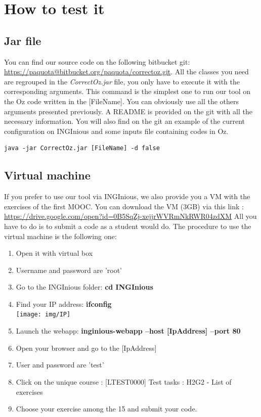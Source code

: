 \documentclass[11pt,a4paper,twoside,openright]{report}
\begin{document}

\nocite{*}


\appendix
\chapter{How to test it}
\section*{Jar file}
\label{app:git}
You can find our source code on the following bitbucket git: 
\url{https://paquota@bitbucket.org/paquota/correctoz.git}. All the classes 
you need are regrouped in the \textit{CorrectOz.jar} file, you only have to 
execute it with the corresponding arguments. This command is the simplest one 
to 
run our tool on the Oz code written in the [FileName]. You can obviously use 
all 
the others arguments presented previously. A README is provided on the git
 with all the necessary information. You will also find on the git an example of 
 the current configuration on INGInious and some inputs file containing codes in Oz.
\begin{lstlisting}
java -jar CorrectOz.jar [FileName] -d false
\end{lstlisting}

\section*{Virtual machine}
If you prefer to use our tool via INGInious, we also provide you a VM with the 
exercises of the first MOOC. You can download the VM (3GB) via this link :\\
\url{https://drive.google.com/open?id=0B5SqZj-xejjrWVRmNkRWR04zdXM}
 All you have to do is to submit a code as a student 
would do. The procedure to use the virtual machine is the following one:
\begin{enumerate}
\item Open it with virtual box
\item Username and password are 'root'
\item Go to the INGInious folder: \textbf{cd INGInious}
\item Find your IP address: \textbf{ifconfig}\\
\texttt{[image: img/IP]}
\item Launch the webapp: \textbf{inginious-webapp --host [IpAddress] --port 80}
\item Open your browser and go to the [IpAddress]
\item User and password are 'test'
\item Click on the unique course : [LTEST0000] Test tasks : H2G2 - List of exercises
\item Choose your exercise among the 15 and submit your code.
\end{enumerate}
\end{document}
